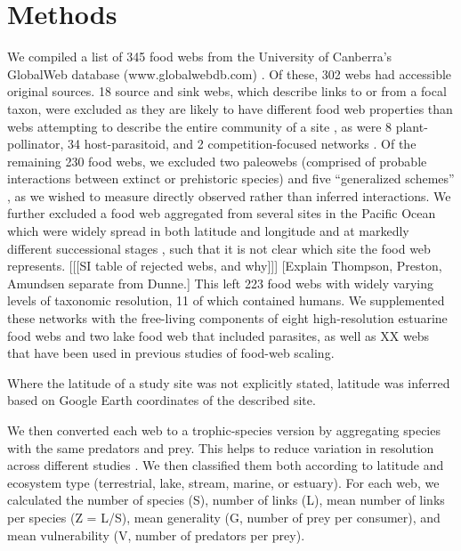 \documentclass[12pt]{article}
\begin{document}
\section*{Methods}

We compiled a list of 345 food webs from the University of Canberra's GlobalWeb database (www.globalwebdb.com) 
\citep{}. Of these, 302 webs had accessible original sources. 
18 source and sink webs, which describe links to or from a focal taxon, were excluded as they are likely 
to have different food web properties than webs attempting to
describe the entire community of a site \citep{Williams2002}, as were 8 plant-pollinator, 34 host-parasitoid, and 2 
competition-focused networks
\citep{Riede2010}. Of the remaining 230 food webs, we excluded two paleowebs (comprised of probable interactions 
between extinct or prehistoric species) \citep{Simenstad1978} and five ``generalized schemes'' 
\citep{Nybakken1982,Percival1929,Swan1961,Landry1977,Petipa1979,Harrison1963}, as 
we wished to measure
directly observed rather than inferred interactions. We further excluded a food web aggregated from several sites in 
the Pacific Ocean which were widely spread in both latitude and longitude and at markedly different successional stages
\citep{Vinogradov1978}, such that it is not clear which site the food web represents. [[[SI table of rejected webs, and why]]] 
[Explain Thompson, Preston, Amundsen separate from Dunne.]
This left 223 food webs with widely varying levels of taxonomic resolution, 11 of which contained humans. 
We supplemented these networks with the free-living components of eight high-resolution estuarine food webs \citep{Dunne2013,Thompson2005} and two lake food web \citep{Preston2012,Amundsen2013} that 
included parasites, as well as XX webs that have been used in previous studies of food-web scaling. 


Where the latitude of a study site was not 
explicitly stated, latitude was inferred based on Google Earth \citep{} coordinates of the described site.


We then converted each web to a trophic-species version by aggregating species
with the same predators and prey. This helps to reduce variation in resolution
across different studies \citep{Dunne2013}.
We then classified them both according to latitude
and ecosystem type (terrestrial, lake, stream, marine, or estuary). For each web, we calculated the 
number of species (S), number of links (L), mean
number of links per species (Z = L/S), mean generality (G, number of prey per consumer), and 
mean vulnerability (V, number of predators per prey).
\end{document}
